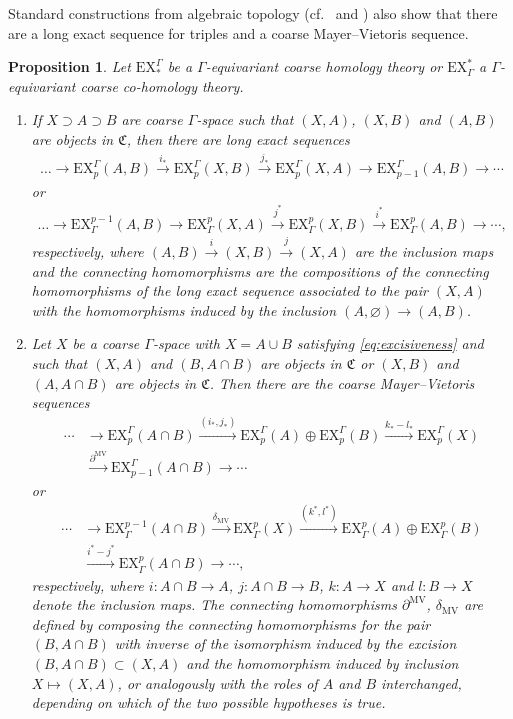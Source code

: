 \documentclass[pdftex]{sigma}
\numberwithin{equation}{section}
\newtheorem{prop}[thm]{Proposition}
\theoremstyle{definition}
\newcommand{\HomolX}{\mathrm{EX}}
\newcommand{\CohomX}{\mathrm{EX}}
\newcommand{\admissible}{{\mathfrak{C}}}
\begin{document}
Standard constructions from algebraic topology (cf.\ \cite[Chapter~4, Section~8, Theorem 5]{Spanier66} and \cite[Section 2.3]{Hatcher_AT})
also show that there are a long exact sequence for triples and a coarse Mayer--Vietoris sequence.

\begin{prop}%
Let $\HomolX^\Gamma_*$ be a $\Gamma$-equivariant coarse homology theory or $\CohomX_\Gamma^*$ a $\Gamma$-equivariant coarse co-homology theory.
\begin{enumerate}\itemsep=0pt
\item[$\bullet$] If $X\supset A\supset B$ are coarse $\Gamma$-space such that $(X,A)$, $(X,B)$ and $(A,B)$ are objects in $\admissible$, then there are long exact sequences
\begin{gather*}
\dots\to \HomolX^\Gamma_p(A,B)\xrightarrow{i_*}\HomolX^\Gamma_p(X,B)\xrightarrow{j_*}\HomolX^\Gamma_p(X,A)\to
\HomolX^\Gamma_{p-1}(A,B)\to \cdots
\end{gather*}
or
\begin{gather*}
\dots\to \CohomX_\Gamma^{p-1}(A,B)\to
\CohomX_\Gamma^p(X,A)\xrightarrow{j^*}\CohomX_\Gamma^p(X,B)\xrightarrow{i^*}\CohomX_\Gamma^{p}(A,B)\to \cdots,
\end{gather*}
respectively,
where $(A,B)\xrightarrow{i}(X,B)\xrightarrow{j}(X,A)$ are the inclusion maps and the connecting homomorphisms are the compositions of the connecting homomorphisms of the long exact sequence associated to the pair $(X,A)$ with the homomorphisms induced by the inclusion $(A,\varnothing)\to (A,B)$.
\item[$\bullet$] Let $X$ be a coarse $\Gamma$-space with $X=A\cup B$ satisfying \eqref{eq:excisiveness} and such that $(X,A)$ and $(B,A\cap B)$ are objects in $\admissible$ or $(X,B)$ and $(A,A\cap B)$ are objects in $\admissible$. Then there are the coarse Mayer--Vietoris sequences
\begin{align*}
\cdots&\to \HomolX^\Gamma_p(A\cap B)\xrightarrow{(i_*,j_*)}\HomolX^\Gamma_p(A)\oplus\HomolX^\Gamma_p(B)\xrightarrow{k_*-l_*} \HomolX^\Gamma_p(X)
\\
&\xrightarrow{\partial^{\mathrm{MV}}
}\HomolX^\Gamma_{p-1}(A\cap B)\to \cdots
\end{align*}
or
\begin{align*}
\cdots&\to \CohomX_\Gamma^{p-1}(A\cap B)\xrightarrow{\delta_{\mathrm{MV}}
}\CohomX_\Gamma^p(X)\xrightarrow{(k^*,l^*)}\CohomX_\Gamma^p(A)\oplus \CohomX_\Gamma^p(B)
\\
&\xrightarrow{i^*-j^*}\CohomX_\Gamma^{p}(A\cap B)\to \cdots,
\end{align*}
respectively,
where $i\colon A\cap B\to A$, $j\colon A\cap B\to B$, $k\colon A\to X$ and $l\colon B\to X$ denote the inclusion maps. The connecting homomorphisms $\partial^{\mathrm{MV}}$, $\delta_{\mathrm{MV}}$ are defined by composing the connecting homomorphisms for the pair $(B,A\cap B)$ with inverse of the isomorphism induced by the excision $(B,A\cap B)\subset (X,A)$ and the homomorphism induced by inclusion $X\mapsto (X,A)$, or analogously with the roles of $A$ and $B$ interchanged, depending on which of the two possible hypotheses is true.
\end{enumerate}
\end{prop}
\end{document}
